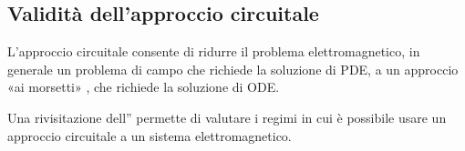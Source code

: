 \documentclass[letterpaper,10pt,italian]{jupyterBook}
\begin{document}
\subsection{Validità dell’approccio circuitale}
\label{\detokenize{ch/circuits-electric-approximation:validita-dell-approccio-circuitale}}\label{\detokenize{ch/circuits-electric-approximation:classical-electromagnetism-circuits-electric-approximation}}\label{\detokenize{ch/circuits-electric-approximation::doc}}
\sphinxAtStartPar
L’approccio circuitale consente di ridurre il problema elettromagnetico, in generale un problema di campo che richiede la soluzione di PDE, a un approccio «ai morsetti» , che richiede la soluzione di ODE.

\sphinxAtStartPar
Una rivisitazione dell”{\hyperref[\detokenize{ch/energy-linear:classical-electromagnetism-energy}]{}} permette di valutare i regimi in cui è possibile usare un approccio circuitale a un sistema elettromagnetico.
\end{document}
